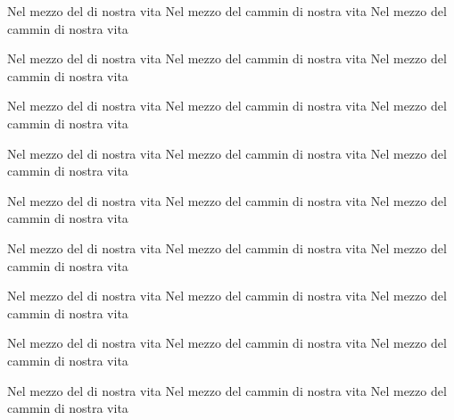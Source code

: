 \documentclass[11pt,a4paper,twoside]{book}
\begin{document}
\beginnumbering
\numberpstarttrue
{}
\pstart\label{1}%
%
%
Nel mezzo del  di nostra vita Nel mezzo del cammin di nostra vita Nel mezzo del cammin di nostra vita
\pend

\pstart\label{2}%
%
%
Nel mezzo del  di nostra vita Nel mezzo del cammin di nostra vita Nel mezzo del cammin di nostra vita
\pend

\pstart\label{3}%
%
%
Nel mezzo del  di nostra vita Nel mezzo del cammin di nostra vita Nel mezzo del cammin di nostra vita
\pend

\pstart\label{4}%
%
%
Nel mezzo del  di nostra vita Nel mezzo del cammin di nostra vita Nel mezzo del cammin di nostra vita
\pend

\pstart\label{5}%
%
%
%
Nel mezzo del  di nostra vita Nel mezzo del cammin di nostra vita Nel mezzo del cammin di nostra vita
\pend

\pstart\label{6}%
%
Nel mezzo del  di nostra vita Nel mezzo del cammin di nostra vita Nel mezzo del cammin di nostra vita
\pend

\pstart\label{7}%
%
Nel mezzo del  di nostra vita Nel mezzo del cammin di nostra vita Nel mezzo del cammin di nostra vita
\pend

\pstart\label{8}%
%
Nel mezzo del  di nostra vita Nel mezzo del cammin di nostra vita Nel mezzo del cammin di nostra vita
\pend

\pstart\label{9}%
%
Nel mezzo del  di nostra vita Nel mezzo del cammin di nostra vita Nel mezzo del cammin di nostra vita
\pend
\end{document}
